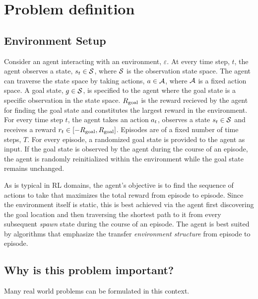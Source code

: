 \section{Problem definition}

\subsection{Environment Setup}
Consider an agent interacting with an environment, $\varepsilon$. At
every time step, $t$, the agent observes a state, $s_t \in \mathcal{S}$,
where $\mathcal{S}$ is the observation state space. The agent can traverse
the state space by taking actions, $a \in \mathcal{A}$, where $\mathcal{A}$ is a
fixed action space. A goal state, $g \in \mathcal{S}$, is specified to
the agent where the goal state is a specific observation in the state
space.  $R_{\text{goal}}$ is the reward recieved by the agent for finding the
goal state and constitutes the largest reward in the environment.  For
every time step $t$, the agent takes an action $a_t$, observes a
state $s_t \in \mathcal{S}$ and receives a reward $r_t \in [-R_{\text{goal}},
R_{\text{goal}}]$.  Episodes are of a fixed number of time steps, $T$. For every
episode, a randomized goal state is provided to the agent as input. If
the goal state is observed by the agent during the course of an episode,
the agent is randomly reinitialized within the environment while the
goal state remains unchanged.

As is typical in RL domains, the agent's objective is to find the
sequence of actions to take that maximizes the total reward from episode
to episode. Since the environment itself is static, this is best
achieved via the agent first discovering the goal location and then
traversing the shortest path to it from every subsequent \emph{spawn}
state during the course of an episode. The agent is best suited by
algorithms that emphasize the  transfer \emph{environment structure}
from episode to episode. 



%
%

\subsection{Why is this problem important?}
Many real world problems can be formulated in this context.


